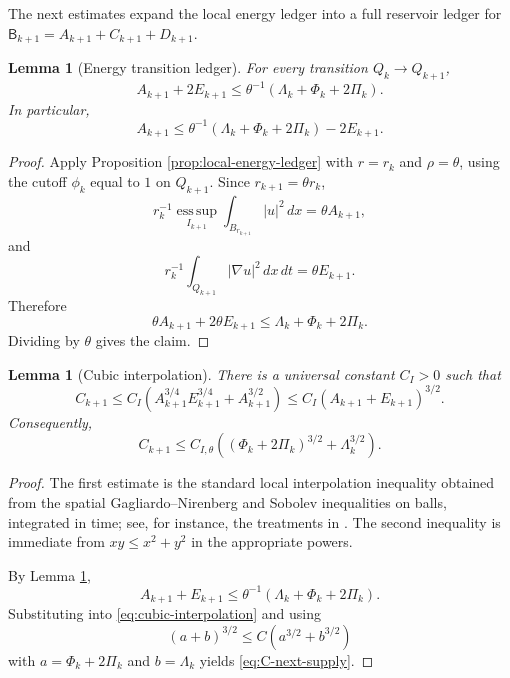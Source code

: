 \documentclass[11pt]{article}
\numberwithin{equation}{section}
\newtheorem{lemma}[theorem]{Lemma}
\newcommand{\Bbad}{\mathsf B}
\newcommand{\dd}{\,d}
\begin{document}
The next estimates expand the local energy ledger into a full reservoir ledger for $\Bbad_{k+1}=A_{k+1}+C_{k+1}+D_{k+1}$.

\begin{lemma}[Energy transition ledger]\label{lem:energy-transition}
For every transition $Q_k\to Q_{k+1}$,
\begin{equation}\label{eq:energy-transition}
A_{k+1}+2E_{k+1}
\leq
\theta^{-1}(\Lambda_k+\Phi_k+2\Pi_k).
\end{equation}
In particular,
\begin{equation}\label{eq:A-ledger}
A_{k+1}
\leq
\theta^{-1}(\Lambda_k+\Phi_k+2\Pi_k)-2E_{k+1}.
\end{equation}
\end{lemma}

\begin{proof}
Apply Proposition \ref{prop:local-energy-ledger} with $r=r_k$ and $\rho=\theta$, using the cutoff $\phi_k$ equal to $1$ on $Q_{k+1}$.  Since $r_{k+1}=\theta r_k$,
\[
r_k^{-1}\operatorname*{ess\,sup}_{I_{k+1}}\int_{B_{r_{k+1}}}|u|^2\dd x
=\theta A_{k+1},
\]
and
\[
r_k^{-1}\int_{Q_{k+1}}|\nabla u|^2\dd x\dd t
=\theta E_{k+1}.
\]
Therefore
\[
\theta A_{k+1}+2\theta E_{k+1}\leq \Lambda_k+\Phi_k+2\Pi_k.
\]
Dividing by $\theta$ gives the claim.
\end{proof}

\begin{lemma}[Cubic interpolation]\label{lem:cubic-interpolation}
There is a universal constant $C_I>0$ such that
\begin{equation}\label{eq:cubic-interpolation}
C_{k+1}
\leq C_I\left(A_{k+1}^{3/4}E_{k+1}^{3/4}+A_{k+1}^{3/2}\right)
\leq C_I(A_{k+1}+E_{k+1})^{3/2}.
\end{equation}
Consequently,
\begin{equation}\label{eq:C-next-supply}
C_{k+1}
\leq C_{I,\theta}\left((\Phi_k+2\Pi_k)^{3/2}+\Lambda_k^{3/2}\right).
\end{equation}
\end{lemma}

\begin{proof}
The first estimate is the standard local interpolation inequality obtained from the spatial Gagliardo--Nirenberg and Sobolev inequalities on balls, integrated in time; see, for instance, the treatments in \cite{SereginLectureNotes}.  The second inequality is immediate from $xy\leq x^2+y^2$ in the appropriate powers.

By Lemma \ref{lem:energy-transition},
\[
A_{k+1}+E_{k+1}\leq \theta^{-1}(\Lambda_k+\Phi_k+2\Pi_k).
\]
Substituting into \eqref{eq:cubic-interpolation} and using
\[
(a+b)^{3/2}\leq C(a^{3/2}+b^{3/2})
\]
with $a=\Phi_k+2\Pi_k$ and $b=\Lambda_k$ yields \eqref{eq:C-next-supply}.
\end{proof}
\end{document}
